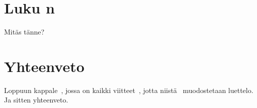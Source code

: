 \documentclass[finnish]{tktltiki2}
\begin{document}
\section{Luku n}


Mitäs tänne?

\section{Yhteenveto}


Loppuun kappale~\cite{hoh07}, jossa on kaikki viitteet~\cite{tcih96}, jotta niistä~\cite{ifp93}
muodostetaan luettelo. Ja sitten yhteenveto.





\end{document}
